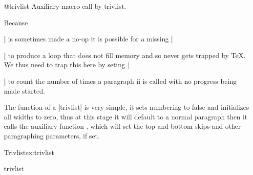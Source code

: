 \begin{texcode}{}{}
 \begin{docCommand}{@trivlist}{}
   Auxiliary macro call by trivlist.
 \end{docCommand}
  Because |\par| is sometimes made a no-op it is possible for a missing
 |\item| to produce a loop that does not fill memory and so never gets
 trapped by \TeX.  We thus need to trap this here by seting |\par| to
 count the number of times a paragraph ii is called with no progress
 being made started.
    \begin{teX}
\def\@trivlist{%
  \if@noskipsec \leavevmode \fi
  \@topsepadd \topsep
  \ifvmode
    \advance\@topsepadd \partopsep
  \else
    \unskip \par
  \fi
  \if@inlabel
    \@noparitemtrue
    \@noparlisttrue
  \else
    \if@newlist \@noitemerr \fi
    \@noparlistfalse
    \@topsep \@topsepadd
  \fi
  \advance\@topsep \parskip
  \leftskip \z@skip
  \rightskip \@rightskip
  \parfillskip \@flushglue
  \par@deathcycles \z@
  \@setpar{\if@newlist
             \advance\par@deathcycles \@ne
             \ifnum \par@deathcycles >\@m
               \@noitemerr
               {\@@par}%
             \fi
           \else
             {\@@par}%
           \fi}%
  \global \@newlisttrue
  \@outerparskip \parskip}
    \end{teX}

The function of a |trivlist| is very simple, it sets numbering to false and initializes all  widths to zero, thus at this stage it will default to a normal paragraph then it calls the auxiliary function , which will set
the top and bottom skips and other paragraphing parameters, if set.

\begin{texexample}{Trivlist}{ex:trivlist}
\lorem
\begin{trivlist}
\item[] \lorem

\end{trivlist}
\lorem

\end{texexample}

 \begin{docCommand}{trivlist} {  }
 \end{docCommand} 
     \begin{teX}
\def\trivlist{%
  \parsep\parskip
  \@nmbrlistfalse
  \@trivlist
  \labelwidth\z@
  \leftmargin\z@
  \itemindent\z@
    \end{teX}


\end{texcode}
